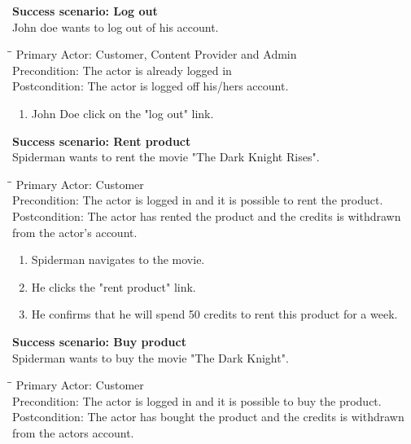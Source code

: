 \textbf{Success scenario: Log out} \\
John doe wants to log out of his account. 
\begin{tabbing}
\hspace{5mm}\=\hspace{26mm}\=\kill
\>Primary Actor:\> Customer, Content Provider and Admin\\
\>Precondition:\> The actor is already logged in\\
\>Postcondition:\> The actor is logged off his/hers account.
\end{tabbing}
\begin{enumerate} \setlength{\itemsep}{-1mm}
	\item John Doe click on the "log out" link.
\end{enumerate}
\vspace{3mm}
\textbf{Success scenario: Rent product} \\
Spiderman wants to rent the movie "The Dark Knight Rises". 
\begin{tabbing}
\hspace{5mm}\=\hspace{26mm}\=\kill
\>Primary Actor:\> Customer\\
\>Precondition:\> The actor is logged in and it is possible to rent the product.\\
\>Postcondition:\> The actor has rented the product and the credits is withdrawn from the actor's account.
\end{tabbing}
\begin{enumerate} \setlength{\itemsep}{-1mm}
	\item Spiderman navigates to the movie.
	\item He clicks the "rent product" link.
	\item He confirms that he will spend 50 credits to rent this product for a week.
\end{enumerate}
\vspace{3mm}
\textbf{Success scenario: Buy product} \\
Spiderman wants to buy the movie "The Dark Knight". 
\begin{tabbing}
\hspace{5mm}\=\hspace{26mm}\=\kill
\>Primary Actor:\> Customer\\
\>Precondition:\> The actor is logged in and it is possible to buy the product.\\
\>Postcondition:\> The actor has bought the product and the credits is withdrawn from the actors account.
\end{tabbing}
